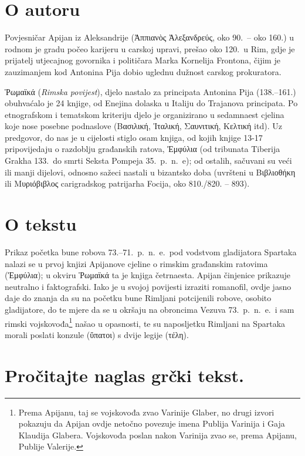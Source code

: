 \section*{O autoru}

Povjesničar Apijan iz Aleksandrije (Ἀππιανὸς Ἀλεξανδρεύς, oko 90.\ – oko 160.) u rodnom je gradu počeo karijeru u carskoj upravi, prešao oko 120.\ u Rim, gdje je prijatelj utjecajnog govornika i političara Marka Kornelija Frontona, čijim je zauzimanjem kod Antonina Pija dobio uglednu dužnost carskog prokuratora.

Ῥωμαϊκά (\textit{Rimska povijest}), djelo nastalo za principata Antonina Pija (138.–161.) obuhvaćalo je 24 knjige, od Enejina dolaska u Italiju do Trajanova principata. Po etnografskom i tematskom kriteriju djelo je organizirano u sedamnaest cjelina koje nose posebne podnaslove (Βασιλική, Ἰταλική, Σαυνιτική, Κελτική itd). Uz predgovor, do nas je u cijelosti stiglo osam knjiga, od kojih knjige 13-17 pripovijedaju o razdoblju građanskih ratova, Ἐμφύλια (od tribunata Tiberija Grakha 133.\ do smrti Seksta Pompeja 35.\ p.~n.~e); od ostalih, sačuvani su veći ili manji dijelovi, odnosno sažeci nastali u bizantsko doba (uvršteni u Βιβλιοθήκη ili Μυριόβιβλος carigradskog patrijarha Focija, oko 810./820. – 893).

\section*{O tekstu}

Prikaz početka bune robova 73.–71.\ p.~n.~e.\ pod vodstvom gladijatora Spartaka nalazi se u prvoj knjizi Apijanove cjeline o rimskim građanskim ratovima (Ἐμφύλια); u okviru Ῥωμαϊκά ta je knjiga četrnaesta. Apijan činjenice prikazuje neutralno i faktografski. Iako je u svojoj povijesti izraziti romanofil, ovdje jasno daje do znanja da su na početku bune Rimljani potcijenili robove, osobito gladijatore, do te mjere da se u okršaju na obroncima Vezuva 73.\ p.~n.~e.\ i sam rimski vojskovođa\footnote{Prema Apijanu, taj se vojskovođa zvao Varinije Glaber, no drugi izvori pokazuju da Apijan ovdje netočno povezuje imena Publija Varinija i Gaja Klaudija Glabera. Vojskovođa poslan nakon Varinija zvao se, prema Apijanu, Publije Valerije.} našao u opasnosti, te su naposljetku Rimljani na Spartaka morali poslati konzule (ὕπατοι) s dvije legije (τέλη).


\section*{Pročitajte naglas grčki tekst.}


